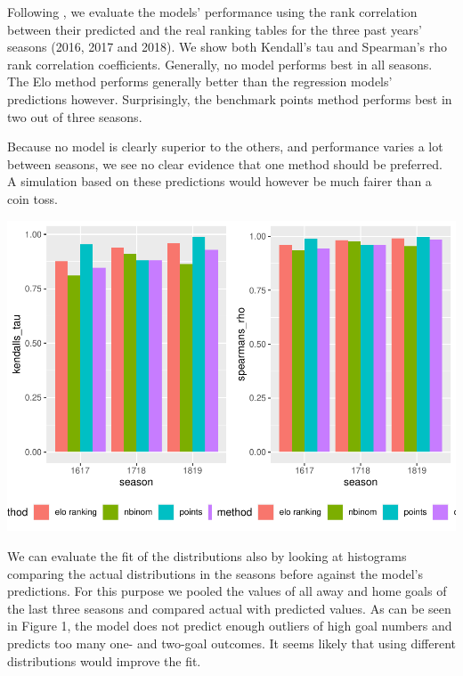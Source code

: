 \documentclass[12pt,a4paper]{article}
\begin{document}
Following \textcite{leitner2010}, we evaluate the models' performance
using the rank correlation between their predicted and the real ranking
tables for the three past years' seasons (2016, 2017 and 2018). We show
both Kendall's tau and Spearman's rho rank correlation coefficients.
Generally, no model performs best in all seasons. The Elo method
performs generally better than the regression models' predictions
however. Surprisingly, the benchmark points method performs best in two
out of three seasons.

Because no model is clearly superior to the others, and performance
varies a lot between seasons, we see no clear evidence that one method
should be preferred. A simulation based on these predictions would
however be much fairer than a coin toss.



\includegraphics{term_paper_eem_files/figure-latex/unnamed-chunk-6-1.pdf}

We can evaluate the fit of the distributions also by looking at
histograms comparing the actual distributions in the seasons before
against the model's predictions. For this purpose we pooled the values
of all away and home goals of the last three seasons and compared actual
with predicted values. As can be seen in Figure 1, the model does not
predict enough outliers of high goal numbers and predicts too many one-
and two-goal outcomes. It seems likely that using different
distributions would improve the fit.
\end{document}

